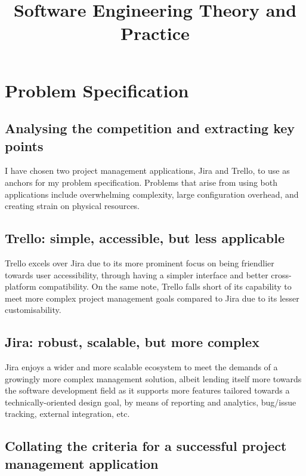 \documentclass{report}
\title{ Software Engineering Theory and Practice}
\begin{document}
	\maketitle
	\tableofcontents
	\newpage
	
	\section{Problem Specification}
	
	\subsection{Analysing the competition and extracting key points}
	
	I have chosen two project management applications, Jira and Trello, to use as anchors for my problem specification.
	Problems that arise from using both applications include overwhelming complexity, large configuration overhead,
	and creating strain on physical resources.
	
	\subsection{Trello: simple, accessible, but less applicable}
	
	Trello excels over Jira due to its more prominent focus on being friendlier towards user accessibility, through having
	a simpler interface and better cross-platform compatibility. On the same note, Trello falls short of its capability to meet
	more complex project management goals compared to Jira due to its lesser customisability.
	
	\subsection{Jira: robust, scalable, but more complex}
	
	Jira enjoys a wider and more scalable ecosystem to meet the demands of a growingly more complex management
	solution, albeit lending itself more towards the software development field as it supports more features tailored towards
	a technically-oriented design goal, by means of reporting and analytics, bug/issue tracking, external integration, etc.
	
	\subsection{Collating the criteria for a successful project management application}
	
\end{document}
